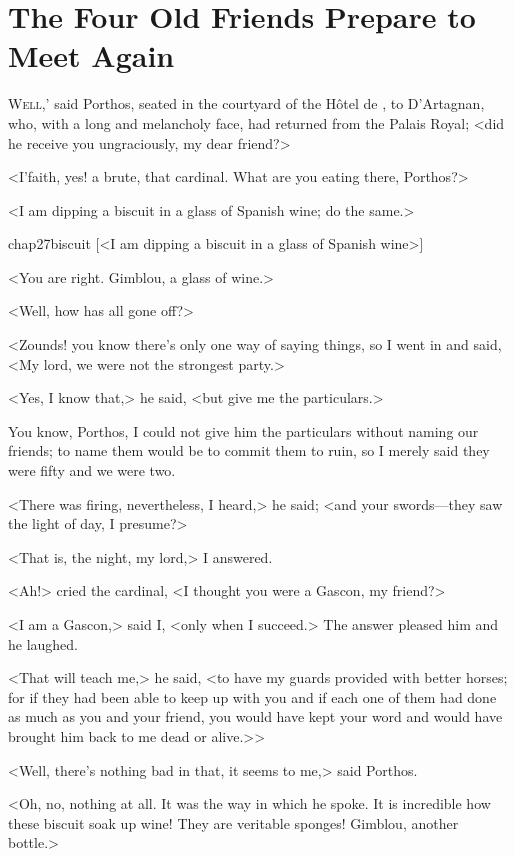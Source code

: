 \chapter{The Four Old Friends Prepare to Meet Again}

 \lettrine[ante=`]{W}{ell},' said Porthos, seated in the courtyard of the Hôtel de , to D'Artagnan, who, with a long and melancholy face, had returned from the Palais Royal; <did he receive you ungraciously, my dear friend?>

\zz
<I'faith, yes! a brute, that cardinal. What are you eating there, Porthos?>

<I am dipping a biscuit in a glass of Spanish wine; do the same.>

\begin{bwbigpic}
	[\basicscale] 
	{chap27biscuit}
	[<I am dipping a biscuit in a glass of Spanish wine>]
\end{bwbigpic}

<You are right. Gimblou, a glass of wine.>

<Well, how has all gone off?>

<Zounds! you know there's only one way of saying things, so I went in and said, <My lord, we were not the strongest party.>

<Yes, I know that,> he said, <but give me the particulars.>

You know, Porthos, I could not give him the particulars without naming our friends; to name them would be to commit them to ruin, so I merely said they were fifty and we were two.

<There was firing, nevertheless, I heard,> he said; <and your swords—they saw the light of day, I presume?>

<That is, the night, my lord,> I answered.

<Ah!> cried the cardinal, <I thought you were a Gascon, my friend?>

<I am a Gascon,> said I, <only when I succeed.> The answer pleased him and he laughed.

<That will teach me,> he said, <to have my guards provided with better horses; for if they had been able to keep up with you and if each one of them had done as much as you and your friend, you would have kept your word and would have brought him back to me dead or alive.>>

<Well, there's nothing bad in that, it seems to me,> said Porthos.

<Oh,  no, nothing at all. It was the way in which he spoke. It is incredible how these biscuit soak up wine! They are veritable sponges! Gimblou, another bottle.>

